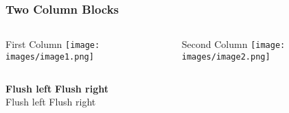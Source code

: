 \begin{frame}
  \frametitle{Two Column Blocks}
  \begin{columns}
    \begin{column}{0.5\textwidth}
      \begin{block}{First Column}
        \texttt{[image: images/image1.png]}
      \end{block}
    \end{column}
    \begin{column}{0.5\textwidth}
      \begin{block}{Second Column}
        \texttt{[image: images/image2.png]}
      \end{block}
    \end{column}
  \end{columns}
  \vfill
  \textbf{Flush left} \hfill \textbf{Flush right} \\
  Flush left \hfill Flush right
\end{frame}

